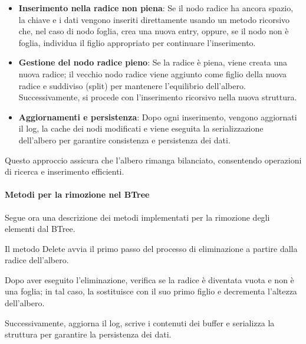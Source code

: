 \documentclass[12pt,a4paper,openright,twoside]{book}
\begin{document}
                    \begin{itemize}
                        \item \textbf{Inserimento nella radice non piena}: Se il nodo radice ha ancora spazio, la chiave e i dati vengono inseriti direttamente usando un metodo ricorsivo che, nel caso di nodo foglia, crea una nuova entry, oppure, se il nodo non è foglia, individua il figlio appropriato per continuare l'inserimento.
                        \item \textbf{Gestione del nodo radice pieno}: Se la radice è piena, viene creata una nuova radice; il vecchio nodo radice viene aggiunto come figlio della nuova radice e suddiviso (split) per mantenere l'equilibrio dell'albero. Successivamente, si procede con l'inserimento ricorsivo nella nuova struttura.
                        \item \textbf{Aggiornamenti e persistenza}: Dopo ogni inserimento, vengono aggiornati il log, la cache dei nodi modificati e viene eseguita la serializzazione dell'albero per garantire consistenza e persistenza dei dati.
                    \end{itemize}

                    Questo approccio assicura che l'albero rimanga bilanciato, consentendo operazioni di ricerca e inserimento efficienti.

                \paragraph{Metodi per la rimozione nel BTree}

                    Segue ora una descrizione dei metodi implementati per la rimozione degli elementi dal BTree.

                    

                    Il metodo Delete avvia il primo passo del processo di eliminazione a partire dalla radice dell'albero.

                    Dopo aver eseguito l'eliminazione, verifica se la radice è diventata vuota e non è una foglia; in tal caso, la sostituisce con il suo primo figlio e decrementa l'altezza dell'albero.

                    Successivamente, aggiorna il log, scrive i contenuti dei buffer e serializza la struttura per garantire la persistenza dei dati.

                    \subparagraph*{}
\end{document}
